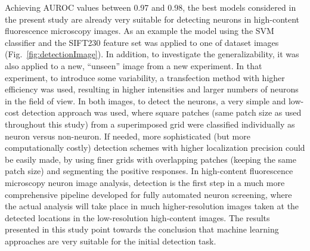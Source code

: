 Achieving AUROC values between 0.97 and 0.98, the best models considered in the present study are already very suitable for detecting neurons in high-content fluorescence microscopy images. As an example the model using the SVM classifier and the SIFT230 feature set was applied to one of dataset images (Fig.~\ref{fig:detectionImage}). In addition, to investigate the generalizability, it was also applied to a new, ``unseen'' image from a new experiment. In that experiment, to introduce some variability, a transfection method with higher efficiency \cite{bredenbeek1993sindbis} was used, resulting in higher intensities and larger numbers of neurons in the field of view. In both images, to detect the neurons, a very simple and low-cost detection approach was used, where square patches (same patch size as used throughout this study) from a superimposed grid were classified individually as neuron versus non-neuron. If needed, more sophisticated (but more computationally costly) detection schemes with higher localization precision could be easily made, by using finer grids with overlapping patches (keeping the same patch size) and segmenting the positive responses. In high-content fluorescence microscopy neuron image analysis, detection is the first step in a much more comprehensive pipeline developed for fully automated neuron screening, where the actual analysis will take place in much higher-resolution images taken at the detected locations in the low-resolution high-content images. The results presented in this study point towards the conclusion that machine learning approaches are very suitable for the initial detection task.

